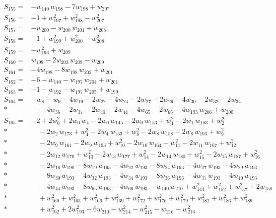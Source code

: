 \documentclass[11pt]{article}
\theoremstyle{remark}\newtheorem{remark}[theorem]{Remark}
\begin{document}
\begin{align*}
S_{155}={}& -w_{140}\,w_{198} - 7w_{198} + w_{207} \\[2pt]
S_{156}={}& -1 + w_{197}^{2} + w_{198}^{2} - w_{207}^{2} \\[2pt]
S_{157}={}& -w_{200} - w_{200}\,w_{201} + w_{208} \\[2pt]
S_{158}={}& -1 + w_{199}^{2} + w_{200}^{2} - w_{208}^{2} \\[2pt]
S_{159}={}& -w_{193}^{2} + w_{209} \\[2pt]
S_{160}={}& w_{198} - 2w_{203}\,w_{209} - w_{209} \\[2pt]
S_{161}={}& -4w_{198} - 8w_{198}\,w_{202} + w_{201} \\[2pt]
S_{162}={}& -6 - w_{140} - w_{197}\,w_{204} + w_{201} \\[2pt]
S_{163}={}& -1 - w_{192} - w_{197}\,w_{205} + w_{199} \\[2pt]
S_{164}={}& -w_{8} - w_{9} - 4w_{19} - 2w_{22} - 4w_{24} - 2w_{27} - 2w_{29} - 4w_{30} - 2w_{32} - 2w_{34} \\*
&\quad  - 4w_{36} - 2w_{37} - 2w_{40} - 2w_{44} - 4w_{65} - 2w_{66} - 4w_{193}\,w_{206} + w_{200} \\[2pt]
S_{165}={}& -2 + 2w_{0}^{2} + 2w_{0}\,w_{4} - 2w_{0}\,w_{145} - 2w_{0}\,w_{153} + w_{1}^{2} - 2w_{1}\,w_{183} + w_{2}^{2} \\*
&\quad  - 2w_{2}\,w_{173} + w_{4}^{2} - 2w_{4}\,w_{153} + w_{8}^{2} - 2w_{8}\,w_{158} - 2w_{8}\,w_{193} + w_{9}^{2} \\*
&\quad  - 2w_{9}\,w_{161} - 2w_{9}\,w_{193} + w_{10}^{2} - 2w_{10}\,w_{164} + w_{11}^{2} - 2w_{11}\,w_{167} + w_{12}^{2} \\*
&\quad  - 2w_{12}\,w_{170} + w_{13}^{2} - 2w_{13}\,w_{177} + w_{14}^{2} - 2w_{14}\,w_{180} + w_{15}^{2} - 2w_{15}\,w_{187} + w_{16}^{2} \\*
&\quad  - 2w_{16}\,w_{190} - 8w_{19}\,w_{193} - 4w_{22}\,w_{193} - 8w_{24}\,w_{193} - 4w_{27}\,w_{193} - 4w_{29}\,w_{193} \\*
&\quad  - 8w_{30}\,w_{193} - 4w_{32}\,w_{193} - 4w_{34}\,w_{193} - 8w_{36}\,w_{193} - 4w_{37}\,w_{193} - 4w_{40}\,w_{193} \\*
&\quad  - 4w_{44}\,w_{193} - 8w_{65}\,w_{193} - 4w_{66}\,w_{193} - w_{140}\,w_{210} + w_{144}^{2} + w_{152}^{2} + w_{157}^{2} + 2w_{158} \\*
&\quad  + w_{160}^{2} + w_{163}^{2} + w_{166}^{2} + w_{169}^{2} + w_{172}^{2} + w_{176}^{2} + w_{179}^{2} + w_{182}^{2} + w_{186}^{2} + w_{189}^{2} \\*
&\quad  + w_{192}^{2} + 2w_{193}^{2} - 6w_{210} - w_{214}^{2} - w_{215}^{2} - w_{216} - w_{216}^{2} \\[2pt]

\end{align*}
\end{document}

